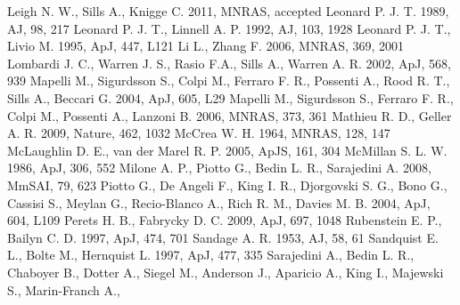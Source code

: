 \begin{thebibliography}{99}
 Leigh
  N. W., Sills A., Knigge C. 2011, MNRAS, accepted
 Leonard
  P. J. T. 1989, AJ, 98, 217
  Leonard P. J. T., Linnell A. P. 1992, AJ, 103, 1928
 Leonard P. J. T., Livio M. 1995,
  ApJ, 447, L121
 Li L.,
  Zhang F. 2006, MNRAS, 369, 2001
  Lombardi J. C., Warren J. S., Rasio F.A., Sills A., Warren A. R. 2002, ApJ, 568, 939
  Mapelli M., Sigurdsson S., Colpi M., Ferraro F. R., Possenti A., Rood R. T., Sills A., Beccari G. 2004, ApJ, 605, L29
  Mapelli M., Sigurdsson S., Ferraro F. R., Colpi M., Possenti A., Lanzoni B. 2006,
  MNRAS, 373, 361
  Mathieu R. D., Geller A. R. 2009, Nature, 462, 1032
 McCrea
  W. H. 1964, MNRAS, 128, 147
 McLaughlin D. E., van der Marel
  R. P. 2005, ApJS, 161, 304 
 McMillan S. L. W. 1986, ApJ,
  306, 552
  Milone A. P., Piotto G., Bedin L. R., Sarajedini A. 2008, MmSAI, 79,
  623
  Piotto G., De Angeli F., King I. R., Djorgovski S. G., Bono G.,
  Cassisi S., Meylan G., Recio-Blanco A., Rich R. M., Davies M. B. 2004,
  ApJ, 604, L109
  Perets H. B., Fabrycky D. C. 2009, ApJ, 697, 1048
 Rubenstein E. P., Bailyn C. D. 1997,
  ApJ, 474, 701
  Sandage A. R. 1953, AJ, 58, 61
 Sandquist E. L., Bolte M., Hernquist L. 1997, ApJ, 477, 335
  Sarajedini A., Bedin L. R., Chaboyer B., Dotter  A., Siegel M.,
  Anderson J., Aparicio A., King I., Majewski S., Marin-Franch A.,

\end{thebibliography}
